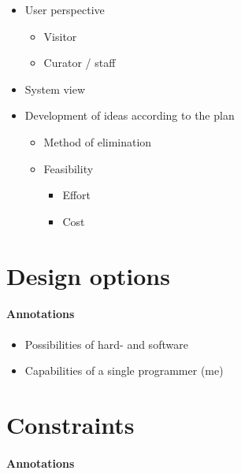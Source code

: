 \begin{itemize}
	\item User perspective
	\begin{itemize}
		\item Visitor
		\item Curator / staff
	\end{itemize}
	\item System view
	\\
	\item Development of ideas according to the plan
	\begin{itemize}
		\item Method of elimination
		\item Feasibility
		\begin{itemize}
			\item Effort
			\item Cost
		\end{itemize}
	\end{itemize}
\end{itemize}


\section{Design options}
\label{conception_design}

\paragraph{Annotations}

\begin{itemize}
	\item Possibilities of hard- and software
	\item Capabilities of a single programmer (me)
\end{itemize}


\section{Constraints}
\label{conception_constraints}

\paragraph{Annotations}

